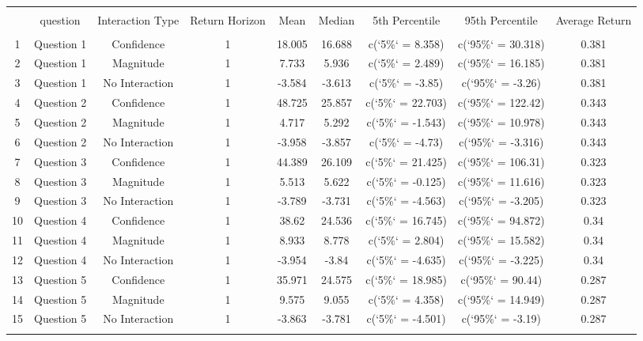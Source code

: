 
\begin{table}[!htbp] \centering 
  \caption{} 
  \label{} 
\begin{tabular}{@{\extracolsep{5pt}} ccccccccc} 
\\[-1.8ex]\hline 
\hline \\[-1.8ex] 
 & question & Interaction Type & Return Horizon & Mean & Median & 5th Percentile & 95th Percentile & Average Return \\ 
\hline \\[-1.8ex] 
1 & Question 1 & Confidence & 1 & 18.005 & 16.688 & c(`5\%` = 8.358) & c(`95\%` = 30.318) & 0.381 \\ 
2 & Question 1 & Magnitude & 1 & 7.733 & 5.936 & c(`5\%` = 2.489) & c(`95\%` = 16.185) & 0.381 \\ 
3 & Question 1 & No Interaction & 1 & -3.584 & -3.613 & c(`5\%` = -3.85) & c(`95\%` = -3.26) & 0.381 \\ 
4 & Question 2 & Confidence & 1 & 48.725 & 25.857 & c(`5\%` = 22.703) & c(`95\%` = 122.42) & 0.343 \\ 
5 & Question 2 & Magnitude & 1 & 4.717 & 5.292 & c(`5\%` = -1.543) & c(`95\%` = 10.978) & 0.343 \\ 
6 & Question 2 & No Interaction & 1 & -3.958 & -3.857 & c(`5\%` = -4.73) & c(`95\%` = -3.316) & 0.343 \\ 
7 & Question 3 & Confidence & 1 & 44.389 & 26.109 & c(`5\%` = 21.425) & c(`95\%` = 106.31) & 0.323 \\ 
8 & Question 3 & Magnitude & 1 & 5.513 & 5.622 & c(`5\%` = -0.125) & c(`95\%` = 11.616) & 0.323 \\ 
9 & Question 3 & No Interaction & 1 & -3.789 & -3.731 & c(`5\%` = -4.563) & c(`95\%` = -3.205) & 0.323 \\ 
10 & Question 4 & Confidence & 1 & 38.62 & 24.536 & c(`5\%` = 16.745) & c(`95\%` = 94.872) & 0.34 \\ 
11 & Question 4 & Magnitude & 1 & 8.933 & 8.778 & c(`5\%` = 2.804) & c(`95\%` = 15.582) & 0.34 \\ 
12 & Question 4 & No Interaction & 1 & -3.954 & -3.84 & c(`5\%` = -4.635) & c(`95\%` = -3.225) & 0.34 \\ 
13 & Question 5 & Confidence & 1 & 35.971 & 24.575 & c(`5\%` = 18.985) & c(`95\%` = 90.44) & 0.287 \\ 
14 & Question 5 & Magnitude & 1 & 9.575 & 9.055 & c(`5\%` = 4.358) & c(`95\%` = 14.949) & 0.287 \\ 
15 & Question 5 & No Interaction & 1 & -3.863 & -3.781 & c(`5\%` = -4.501) & c(`95\%` = -3.19) & 0.287 \\ 
\hline \\[-1.8ex] 
\end{tabular} 
\end{table} 
